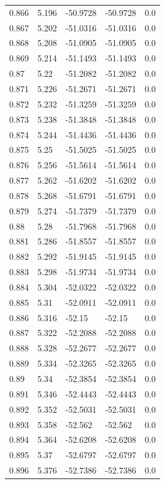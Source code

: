 \begin{table}[H]
\begin{tabular}{lllll}
0.866 & 5.196 & -50.9728 & -50.9728 & 0.0 \\
0.867 & 5.202 & -51.0316 & -51.0316 & 0.0 \\
0.868 & 5.208 & -51.0905 & -51.0905 & 0.0 \\
0.869 & 5.214 & -51.1493 & -51.1493 & 0.0 \\
0.87 & 5.22 & -51.2082 & -51.2082 & 0.0 \\
0.871 & 5.226 & -51.2671 & -51.2671 & 0.0 \\
0.872 & 5.232 & -51.3259 & -51.3259 & 0.0 \\
0.873 & 5.238 & -51.3848 & -51.3848 & 0.0 \\
0.874 & 5.244 & -51.4436 & -51.4436 & 0.0 \\
0.875 & 5.25 & -51.5025 & -51.5025 & 0.0 \\
0.876 & 5.256 & -51.5614 & -51.5614 & 0.0 \\
0.877 & 5.262 & -51.6202 & -51.6202 & 0.0 \\
0.878 & 5.268 & -51.6791 & -51.6791 & 0.0 \\
0.879 & 5.274 & -51.7379 & -51.7379 & 0.0 \\
0.88 & 5.28 & -51.7968 & -51.7968 & 0.0 \\
0.881 & 5.286 & -51.8557 & -51.8557 & 0.0 \\
0.882 & 5.292 & -51.9145 & -51.9145 & 0.0 \\
0.883 & 5.298 & -51.9734 & -51.9734 & 0.0 \\
0.884 & 5.304 & -52.0322 & -52.0322 & 0.0 \\
0.885 & 5.31 & -52.0911 & -52.0911 & 0.0 \\
0.886 & 5.316 & -52.15 & -52.15 & 0.0 \\
0.887 & 5.322 & -52.2088 & -52.2088 & 0.0 \\
0.888 & 5.328 & -52.2677 & -52.2677 & 0.0 \\
0.889 & 5.334 & -52.3265 & -52.3265 & 0.0 \\
0.89 & 5.34 & -52.3854 & -52.3854 & 0.0 \\
0.891 & 5.346 & -52.4443 & -52.4443 & 0.0 \\
0.892 & 5.352 & -52.5031 & -52.5031 & 0.0 \\
0.893 & 5.358 & -52.562 & -52.562 & 0.0 \\
0.894 & 5.364 & -52.6208 & -52.6208 & 0.0 \\
0.895 & 5.37 & -52.6797 & -52.6797 & 0.0 \\
0.896 & 5.376 & -52.7386 & -52.7386 & 0.0 \\

\end{tabular}
\end{table}
